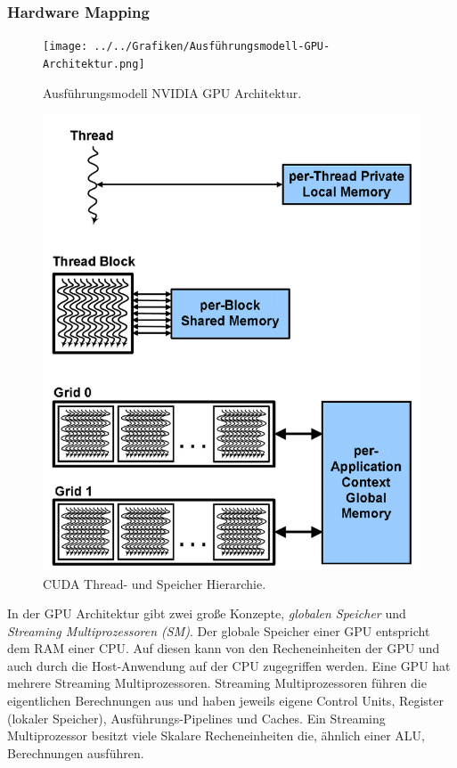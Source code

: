 \subsubsection*{Hardware Mapping}
\begin{figure}[]
	\centering
	\begin{minipage}[b]{0.49\textwidth}
		\centering
		\texttt{[image: ../../Grafiken/Ausführungsmodell-GPU-Architektur.png]}
		\caption{Ausführungsmodell NVIDIA GPU Architektur. \cite{Larkin2016}}
		\label{fig::ga04}
	\end{minipage}
	\hfill
	\begin{minipage}[b]{0.49\textwidth}
		\centering
		\includegraphics[width=1\textwidth]{../../Grafiken/GPU-Memory-Hierarchie-with-Threads.PNG}
		\caption{CUDA Thread- und Speicher Hierarchie. \cite{NVIDIA}}
		\label{fig::ga05}
	\end{minipage}
\end{figure}

In der GPU Architektur gibt zwei große Konzepte, \emph{globalen Speicher} und \emph{Streaming Multiprozessoren (SM)}.
Der globale Speicher einer GPU entspricht dem RAM einer CPU.
Auf diesen kann von den Recheneinheiten der GPU und auch durch die Host-Anwendung auf der CPU zugegriffen werden. 
Eine GPU hat mehrere Streaming Multiprozessoren.
Streaming Multiprozessoren führen die eigentlichen Berechnungen aus und haben jeweils eigene Control Units, Register (lokaler Speicher), Ausführungs-Pipelines und Caches.
Ein Streaming Multiprozessor besitzt viele Skalare Recheneinheiten die, ähnlich einer ALU, Berechnungen ausführen.


